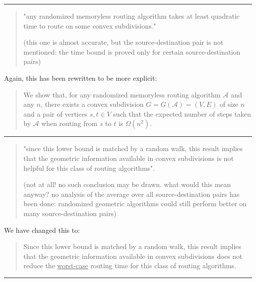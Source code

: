 \documentclass{article}
\begin{document}
\hrule

\begin{quote}
"any randomized memoryless routing algorithm takes at least quadratic time
to route on some convex subdivisions."

(this one is almost accurate, but the source-destination pair is not mentioned: the time
bound is proved only for certain source-destination pairs)
\end{quote}

Again, this has been rewritten to be more explicit:

\begin{quote}
We show that, for any randomized memoryless routing algorithm $\mathcal{A}$ and any $n$, there exists a convex subdivision $G=G(\mathcal{A})=(V,E)$ of size $n$ and a pair of vertices $s,t\in V$ such that the expected number of steps taken by $\mathcal{A}$ when routing from $s$ to $t$ is $\Omega(n^2)$. 
\end{quote}

\hrule

\begin{quote}
"since this lower bound is matched by a random walk, this result implies
that the geometric information available in convex subdivisions is not
helpful for this class of routing algorithms".

(not at all! no such conclusion may be drawn. what would this mean anyway?
no analysis of the average over all source-destination pairs has been done:
randomized geometric algorithms could still perform better on many
source-destination pairs)
\end{quote}

We have changed this to:

\begin{quote}
Since this
lower bound is matched by a random walk, this result implies that the
geometric information available in convex subdivisions does not reduce the \underline{worst-case} routing time for this class
of routing algorithms.
\end{quote}

\hrule
\end{document}
